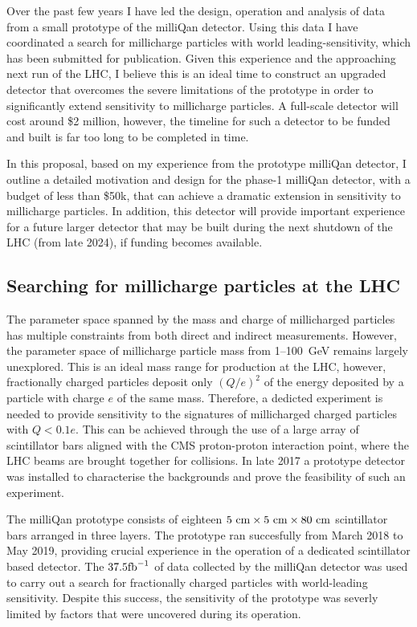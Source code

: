 \documentclass[11pt]{article}
\theoremstyle{plain} \numberwithin{equation}{section}
\theoremstyle{definition}
\begin{document}
Over the past few years I have led the design, operation and analysis
of data from a small prototype of the milliQan detector. Using this data I have coordinated
a search for millicharge particles with world leading-sensitivity, which has been submitted 
for publication. Given this experience and the approaching next run of the LHC, I believe this is an ideal 
time to construct an upgraded detector that overcomes the severe limitations of the prototype
in order to significantly extend sensitivity to millicharge particles. A full-scale 
detector will cost around \$2 million, however, the timeline for such a detector to be funded and built
is far too long to be completed in time.  

In this proposal, based on my experience from the prototype milliQan detector, 
I outline a detailed motivation and design for the phase-1 milliQan detector, 
with a budget of less than \$50k, that can achieve a dramatic extension 
in sensitivity to millicharge particles.
In addition, this detector will provide important experience for a future larger detector
that may be built during the next shutdown of the LHC (from late 2024), if funding becomes available.

%
\subsection*{Searching for millicharge particles at the LHC}
%
The parameter space spanned by the mass and charge of millicharged particles
has multiple constraints from both direct and indirect measurements.
However, the parameter space of millicharge particle mass from 1--100~GeV remains 
largely unexplored. This is an ideal mass
range for production at the LHC, however,
fractionally charged particles deposit only $(Q/e)^2$ of the energy 
deposited by a particle with charge $e$ of
the same mass. Therefore, a dedicted experiment is needed to provide sensitivity to the signatures of 
millicharged charged particles with $Q< 0.1 e$.
This can be achieved through the use of a 
large array of scintillator bars aligned with the CMS proton-proton 
interaction point, where the LHC beams are brought together for collisions. 
In late 2017 a prototype detector was installed to characterise the backgrounds and
prove the feasibility of such an experiment.

The milliQan prototype consists of eighteen $5~\rm{cm}\times5~\rm{cm}\times80~\rm{cm}$ 
scintillator bars arranged in three layers. The prototype ran succesfully from March 2018 to May 2019, providing crucial
experience in the operation of a dedicated scintillator based detector. 
The $37.5\rm{fb}^{-1}$ of data collected by the milliQan detector was used to carry out
a search for fractionally charged particles with world-leading sensitivity.
Despite this success, the sensitivity of the prototype was severly limited by
factors that were uncovered during its operation. 
\end{document}
